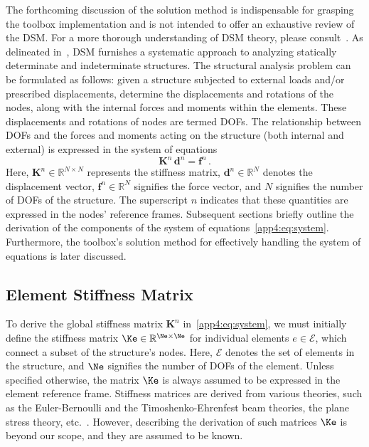 The forthcoming discussion of the solution method is indispensable for grasping the toolbox implementation and is not intended to offer an exhaustive review of the \ac{DSM}. For a more thorough understanding of \ac{DSM} theory, please consult~\cite{turner1959direct, turner1964further, logan2002first, hutton2004fundamentals}. As delineated in~\cite{samuelsson2006history}, \ac{DSM} furnishes a systematic approach to analyzing statically determinate and indeterminate structures. The structural analysis problem can be formulated as follows: given a structure subjected to external loads and/or prescribed displacements, determine the displacements and rotations of the nodes, along with the internal forces and moments within the elements. These displacements and rotations of nodes are termed \acp{DOF}. The relationship between \acp{DOF} and the forces and moments acting on the structure (both internal and external) is expressed in the system of equations
%
\begin{equation}
  \label{app4:eq:system}
  \mathbf{K}^{n} \, \mathbf{d}^{n} = \mathbf{f}^{n} \, \text{.}
\end{equation}
%
Here, $\mathbf{K}^{n} \in \mathbb{R}^{N \times N}$ represents the stiffness matrix, $\mathbf{d}^{n} \in \mathbb{R}^{N}$ denotes the displacement vector, $\mathbf{f}^{n} \in \mathbb{R}^{N}$ signifies the force vector, and $N$ signifies the number of \acp{DOF} of the structure. The superscript $n$ indicates that these quantities are expressed in the nodes' reference frames. Subsequent sections briefly outline the derivation of the components of the system of equations~\eqref{app4:eq:system}. Furthermore, the toolbox's solution method for effectively handling the system of equations is later discussed.

\subsection{Element Stiffness Matrix}

To derive the global stiffness matrix $\mathbf{K}^{n}$ in~\eqref{app4:eq:system}, we must initially define the stiffness matrix $\Ke \in \mathbb{R}^{\Ne \times \Ne}$ for individual elements $e \in \mathcal{E}$, which connect a subset of the structure's nodes. Here, $\mathcal{E}$ denotes the set of elements in the structure, and $\Ne$ signifies the number of \acp{DOF} of the element. Unless specified otherwise, the matrix $\Ke$ is always assumed to be expressed in the element reference frame. Stiffness matrices are derived from various theories, such as the Euler-Bernoulli and the Timoshenko-Ehrenfest beam theories, the plane stress theory, etc.~\cite{hutton2004fundamentals}. However, describing the derivation of such matrices $\Ke$ is beyond our scope, and they are assumed to be known.

